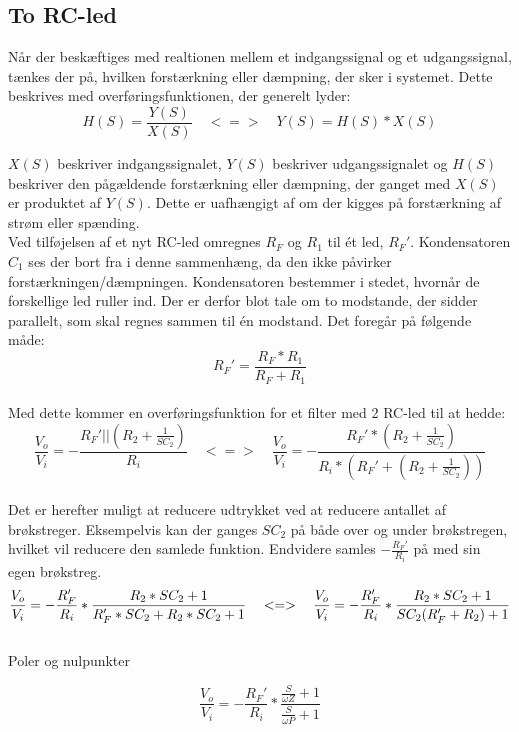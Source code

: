 \subsection{To RC-led}
\label{ToRCLed}
Når der beskæftiges med realtionen mellem et indgangssignal og et udgangssignal, tænkes der på, hvilken forstærkning eller dæmpning, der sker i systemet. Dette beskrives med overføringsfunktionen, der generelt lyder:
\begin{equation}
	H(S)=\frac{Y(S)}{X(S)}
\quad
	<=>
\quad	
	Y(S)=H(S)*X(S)
\end{equation}

\noindent
$X(S)$ beskriver indgangssignalet, $Y(S)$ beskriver udgangssignalet og $H(S)$ beskriver den pågældende forstærkning eller dæmpning, der ganget med $X(S)$ er produktet af $Y(S)$. Dette er uafhængigt af om der kigges på forstærkning af strøm eller spænding. \\

\noindent
Ved tilføjelsen af et nyt RC-led omregnes $R_F$ og $R_1$ til ét led, $R_F'$. Kondensatoren $C_1$ ses der bort fra i denne sammenhæng, da den ikke påvirker forstærkningen/dæmpningen. Kondensatoren bestemmer i stedet, hvornår de forskellige led ruller ind. Der er derfor blot tale om to modstande, der sidder parallelt, som skal regnes sammen til én modstand. Det foregår på følgende måde: \\

\begin{equation}
	R_F'= \frac{R_F*R_1}{R_F+R_1}
\end{equation}\\

\noindent
Med dette kommer en overføringsfunktion for et filter med 2 RC-led til at hedde:\\

\begin{equation}
	\frac{V_o}{V_i}=-\frac{R_F'||(R_2+\frac{1}{SC_2})}{R_i}
\quad
	<=>
\quad
	\frac{V_o}{V_i}=-\frac{R_F'*(R_2+\frac{1}{SC_2})}{R_i*(R_F'+(R_2+\frac{1}{SC_2}))}
\end{equation}\\

\noindent
Det er herefter muligt at reducere udtrykket ved at reducere antallet af brøkstreger. Eksempelvis kan der ganges $SC_2$ på både over og under brøkstregen, hvilket vil reducere den samlede funktion. Endvidere samles $-\frac{R_F'}{R_i}$ på med sin egen brøkstreg.\\

\begin{equation}
	\frac{V_o}{V_i}=-\frac{R_F'}{R_i}* \frac{R_2*SC_2+1}{R_F'*SC_2+R_2*SC_2+1}
\quad
	<=>
\quad
	\frac{V_o}{V_i}=-\frac{R_F'}{R_i}*\frac{R_2*SC_2+1}{SC_2(R_F'+R_2)+1}\\
\end{equation}\\

\noindent
Poler og nulpunkter

\begin{equation}
	\frac{V_o}{V_i}=-\frac{R_F'}{R_i}*\frac{\frac{S}{\omega Z}+1}{\frac{S}{\omega P}+1}
\end{equation}